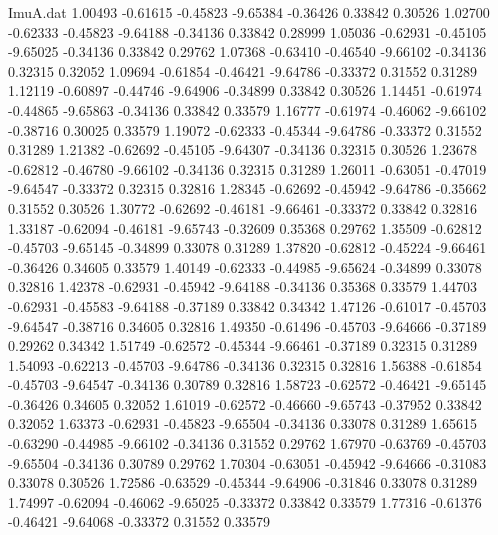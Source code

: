 \begin{filecontents}{ImuA.dat}
   1.00493   -0.61615   -0.45823   -9.65384   -0.36426    0.33842    0.30526
   1.02700   -0.62333   -0.45823   -9.64188   -0.34136    0.33842    0.28999
   1.05036   -0.62931   -0.45105   -9.65025   -0.34136    0.33842    0.29762
   1.07368   -0.63410   -0.46540   -9.66102   -0.34136    0.32315    0.32052
   1.09694   -0.61854   -0.46421   -9.64786   -0.33372    0.31552    0.31289
   1.12119   -0.60897   -0.44746   -9.64906   -0.34899    0.33842    0.30526
   1.14451   -0.61974   -0.44865   -9.65863   -0.34136    0.33842    0.33579
   1.16777   -0.61974   -0.46062   -9.66102   -0.38716    0.30025    0.33579
   1.19072   -0.62333   -0.45344   -9.64786   -0.33372    0.31552    0.31289
   1.21382   -0.62692   -0.45105   -9.64307   -0.34136    0.32315    0.30526
   1.23678   -0.62812   -0.46780   -9.66102   -0.34136    0.32315    0.31289
   1.26011   -0.63051   -0.47019   -9.64547   -0.33372    0.32315    0.32816
   1.28345   -0.62692   -0.45942   -9.64786   -0.35662    0.31552    0.30526
   1.30772   -0.62692   -0.46181   -9.66461   -0.33372    0.33842    0.32816
   1.33187   -0.62094   -0.46181   -9.65743   -0.32609    0.35368    0.29762
   1.35509   -0.62812   -0.45703   -9.65145   -0.34899    0.33078    0.31289
   1.37820   -0.62812   -0.45224   -9.66461   -0.36426    0.34605    0.33579
   1.40149   -0.62333   -0.44985   -9.65624   -0.34899    0.33078    0.32816
   1.42378   -0.62931   -0.45942   -9.64188   -0.34136    0.35368    0.33579
   1.44703   -0.62931   -0.45583   -9.64188   -0.37189    0.33842    0.34342
   1.47126   -0.61017   -0.45703   -9.64547   -0.38716    0.34605    0.32816
   1.49350   -0.61496   -0.45703   -9.64666   -0.37189    0.29262    0.34342
   1.51749   -0.62572   -0.45344   -9.66461   -0.37189    0.32315    0.31289
   1.54093   -0.62213   -0.45703   -9.64786   -0.34136    0.32315    0.32816
   1.56388   -0.61854   -0.45703   -9.64547   -0.34136    0.30789    0.32816
   1.58723   -0.62572   -0.46421   -9.65145   -0.36426    0.34605    0.32052
   1.61019   -0.62572   -0.46660   -9.65743   -0.37952    0.33842    0.32052
   1.63373   -0.62931   -0.45823   -9.65504   -0.34136    0.33078    0.31289
   1.65615   -0.63290   -0.44985   -9.66102   -0.34136    0.31552    0.29762
   1.67970   -0.63769   -0.45703   -9.65504   -0.34136    0.30789    0.29762
   1.70304   -0.63051   -0.45942   -9.64666   -0.31083    0.33078    0.30526
   1.72586   -0.63529   -0.45344   -9.64906   -0.31846    0.33078    0.31289
   1.74997   -0.62094   -0.46062   -9.65025   -0.33372    0.33842    0.33579
   1.77316   -0.61376   -0.46421   -9.64068   -0.33372    0.31552    0.33579

\end{filecontents}
